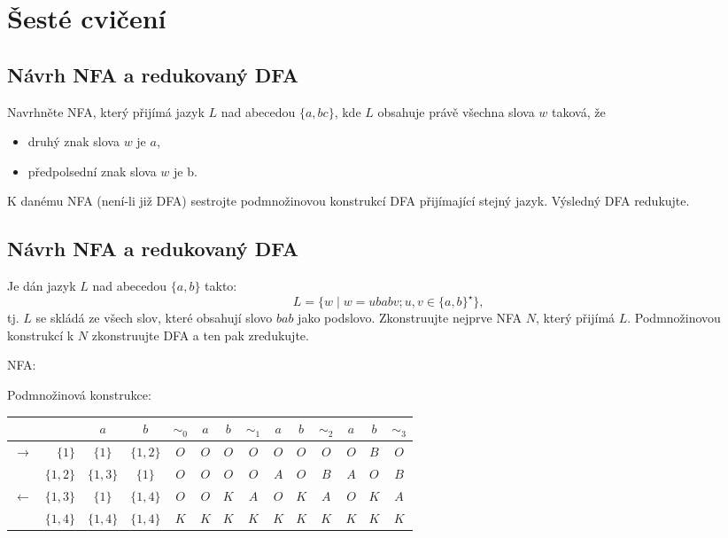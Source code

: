 \section{Šesté cvičení}

\subsection{Návrh NFA a redukovaný DFA}
Navrhněte NFA, který přijímá jazyk $L$ nad abecedou $\{a,bc\}$, kde $L$ obsahuje právě všechna slova $w$ taková, že
\begin{itemize}[noitemsep]
    \item druhý znak slova $w$ je $a$,
    \item předpolsední znak slova $w$ je b.
\end{itemize}
K danému NFA (není-li již DFA) sestrojte podmnožinovou konstrukcí DFA přijímající stejný jazyk. Výsledný DFA redukujte.

\subsection{Návrh NFA a redukovaný DFA}
Je dán jazyk $L$ nad abecedou $\{a,b\}$ takto: 
\[L = \{w \mid w = ubabv; u,v\in\{a,b\}^\star\}\text{,}\] 
tj. $L$ se skládá ze všech slov, které obsahují slovo $bab$ jako podslovo. Zkonstruujte nejprve NFA $N$, který přijímá 
$L$. Podmnožinovou konstrukcí k $N$ zkonstruujte DFA a ten pak zredukujte.

NFA: 


Podmnožinová konstrukce: 

\begin{tabular}{|r r|c c||c|c c||c|c c||c|c c||c|}
    \hline
    & & $a$ & $b$ & $ \sim_0 $ & $a$ & $b$ & $\sim_1$ & $a$ & $b$ & $\sim_2$ & $a$ & $b$ & $\sim_3$ \\ \hline \hline
    $\to$ & $\{1\}$ & $\{1\}$ & $\{1,2\}$ & $O$ & $O$ & $O$ & $O$ & $O$ & $O$ & $O$ & $O$ & $B$ & $O$ \\
          & $\{1,2\}$ & $\{1,3\}$ & $\{1\}$ & $O$ & $O$ & $O$ & $O$ & $A$ & $O$ & $B$ & $A$ & $O$ & $B$ \\
    $\gets$ & $\{1,3\}$ & $\{1\}$ & $\{1,4\}$ & $O$ & $O$ & $K$ & $A$ & $O$ & $K$ & $A$ & $O$ & $K$ & $A$ \\
            & $\{1,4\}$ & $\{1,4\}$ & $\{1,4\}$ & $K$ & $K$ & $K$ & $K$ & $K$ & $K$ & $K$ & $K$ & $K$ & $K$ \\ 
    \hline
\end{tabular}

